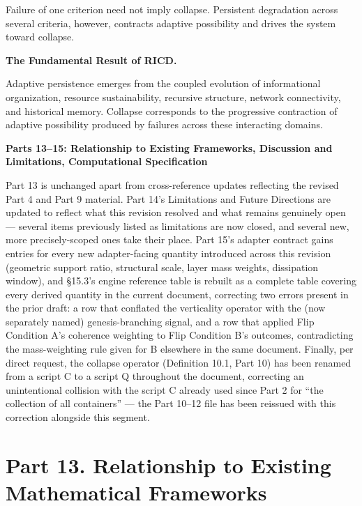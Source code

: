 \documentclass[
]{article}
\begin{document}
Failure of one criterion need not imply collapse. Persistent degradation
across several criteria, however, contracts adaptive possibility and
drives the system toward collapse.

\textbf{The Fundamental Result of RICD.}

Adaptive persistence emerges from the coupled evolution of informational
organization, resource sustainability, recursive structure, network
connectivity, and historical memory. Collapse corresponds to the
progressive contraction of adaptive possibility produced by failures
across these interacting domains.

\textbf{Parts 13--15: Relationship to Existing Frameworks, Discussion
and Limitations, Computational Specification}

Part 13 is unchanged apart from cross-reference updates reflecting the
revised Part 4 and Part 9 material. Part 14's Limitations and Future
Directions are updated to reflect what this revision resolved and what
remains genuinely open --- several items previously listed as
limitations are now closed, and several new, more precisely-scoped ones
take their place. Part 15's adapter contract gains entries for every new
adapter-facing quantity introduced across this revision (geometric
support ratio, structural scale, layer mass weights, dissipation
window), and §15.3's engine reference table is rebuilt as a complete
table covering every derived quantity in the current document,
correcting two errors present in the prior draft: a row that conflated
the verticality operator with the (now separately named)
genesis-branching signal, and a row that applied Flip Condition A's
coherence weighting to Flip Condition B's outcomes, contradicting the
mass-weighting rule given for B elsewhere in the same document. Finally,
per direct request, the collapse operator (Definition 10.1, Part 10) has
been renamed from a script C to a script Q throughout the document,
correcting an unintentional collision with the script C already used
since Part 2 for ``the collection of all containers'' --- the Part
10--12 file has been reissued with this correction alongside this
segment.

\hypertarget{part-13.-relationship-to-existing-mathematical-frameworks}{%
\section{Part 13. Relationship to Existing Mathematical
Frameworks}\label{part-13.-relationship-to-existing-mathematical-frameworks}}
\end{document}
